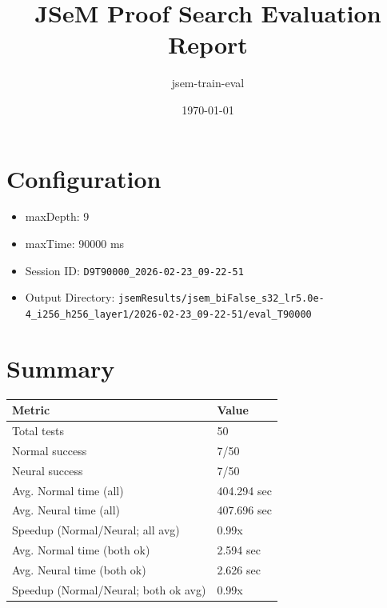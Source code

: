 \documentclass[a4paper,10pt]{article}
\title{JSeM Proof Search Evaluation Report}
\author{jsem-train-eval}
\date{\today}
\begin{document}
\maketitle

\section{Configuration}
\begin{itemize}
\item maxDepth: 9
\item maxTime: 90000 ms
\item Session ID: \texttt{D9T90000\_2026-02-23\_09-22-51}
\item Output Directory: \texttt{jsemResults/jsem\_biFalse\_s32\_lr5.0e-4\_i256\_h256\_layer1/2026-02-23\_09-22-51/eval\_T90000}
\end{itemize}

\section{Summary}
\begin{tabular}{ll}
\toprule
\textbf{Metric} & \textbf{Value} \\
\midrule
Total tests & 50 \\
Normal success & 7/50 \\
Neural success & 7/50 \\
\midrule
Avg. Normal time (all) & 404.294 sec \\
Avg. Neural time (all) & 407.696 sec \\
Speedup (Normal/Neural; all avg) & 0.99x \\
Avg. Normal time (both ok) & 2.594 sec \\
Avg. Neural time (both ok) & 2.626 sec \\
Speedup (Normal/Neural; both ok avg) & 0.99x \\
\bottomrule
\end{tabular}
\end{document}
